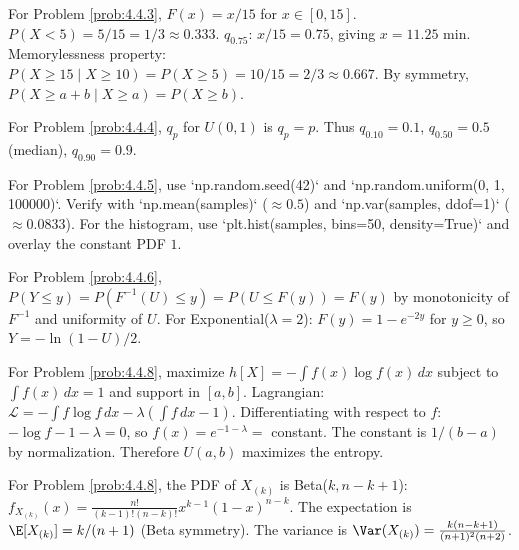 \begin{sugerencia}
	\label{sug:4.4.3}
	For Problem \ref{prob:4.4.3}, $F(x) = x/15$ for $x \in [0, 15]$. $P(X < 5) = 5/15 = 1/3 \approx 0.333$. $q_{0.75}$: $x/15 = 0.75$, giving $x = 11.25$ min. Memorylessness property: $P(X \ge 15 \mid X \ge 10) = P(X \ge 5) = 10/15 = 2/3 \approx 0.667$. By symmetry, $P(X \ge a + b \mid X \ge a) = P(X \ge b)$.
\end{sugerencia}

\begin{sugerencia}
	\label{sug:4.4.4}
	For Problem \ref{prob:4.4.4}, $q_{p}$ for $U(0, 1)$ is $q_{p} = p$. Thus $q_{0.10} = 0.1$, $q_{0.50} = 0.5$ (median), $q_{0.90} = 0.9$.
\end{sugerencia}

\begin{sugerencia}
	\label{sug:4.4.5}
	For Problem \ref{prob:4.4.5}, use `np.random.seed(42)` and `np.random.uniform(0, 1, 100000)`. Verify with `np.mean(samples)` ($\approx 0.5$) and `np.var(samples, ddof=1)` ($\approx 0.0833$). For the histogram, use `plt.hist(samples, bins=50, density=True)` and overlay the constant PDF $1$.
\end{sugerencia}

\begin{sugerencia}
	\label{sug:4.4.6}
	For Problem \ref{prob:4.4.6}, $P(Y \le y) = P(F^{-1}(U) \le y) = P(U \le F(y)) = F(y)$ by monotonicity of $F^{-1}$ and uniformity of $U$. For Exponential($\lambda = 2$): $F(y) = 1 - e^{-2y}$ for $y \ge 0$, so $Y = -\ln(1-U)/2$.
\end{sugerencia}

\begin{sugerencia}
	\label{sug:4.4.7}
	For Problem \ref{prob:4.4.8}, maximize $h[X] = -\int f(x) \log f(x)\,dx$ subject to $\int f(x)\,dx = 1$ and support in $[a, b]$. Lagrangian: $\mathcal{L} = -\int f \log f\,dx - \lambda(\int f\,dx - 1)$. Differentiating with respect to $f$: $-\log f - 1 - \lambda = 0$, so $f(x) = e^{-1-\lambda} = $ constant. The constant is $1/(b-a)$ by normalization. Therefore $U(a,b)$ maximizes the entropy.
\end{sugerencia}

\begin{sugerencia}
	\label{sug:4.4.8}
	For Problem \ref{prob:4.4.8}, the PDF of $X_{(k)}$ is Beta($k, n-k+1$): $f_{X_{(k)}}(x) = \frac{n!}{(k-1)!(n-k)!} x^{k-1}(1-x)^{n-k}$. The expectation is $\E[X_{(k)}] = k/(n+1)$ (Beta symmetry). The variance is $\Var(X_{(k)}) = \frac{k(n-k+1)}{(n+1)^{2}(n+2)}$.
\end{sugerencia}


